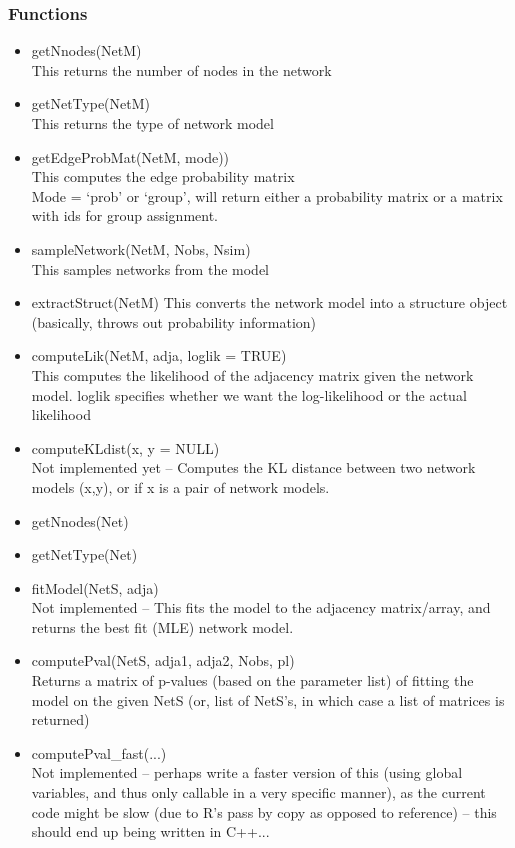 \documentclass[11pt]{article}
\begin{document}
\subsubsection{Functions}
\begin{itemize} 
\item getNnodes(NetM)\\
This returns the number of nodes in the network
\item getNetType(NetM)\\
This returns the type of network model
\item getEdgeProbMat(NetM, mode))\\
This computes the edge probability matrix\\
Mode = `prob' or `group', will return either a probability matrix or a matrix with ids for group assignment. 
\item sampleNetwork(NetM, Nobs, Nsim)\\
This samples networks from the model
\item extractStruct(NetM)
This converts the network model into a structure object (basically, throws out probability information)
\item computeLik(NetM, adja, loglik = TRUE)\\
This computes the likelihood of the adjacency matrix given the network model. loglik specifies whether we want the log-likelihood or the actual likelihood
\item computeKLdist(x, y = NULL) \\
Not implemented yet -- Computes the KL distance between two network models (x,y), or if x is a pair of network models. 

\item getNnodes(Net)
\item getNetType(Net)
\item fitModel(NetS, adja)\\
Not implemented -- This fits the model to the adjacency matrix/array, and returns the best fit (MLE) network model. 
\item computePval(NetS, adja1, adja2, Nobs, pl)\\
Returns a matrix of p-values (based on the parameter list) of fitting the model on the given NetS (or, list of NetS's, in which case a list of matrices is returned)
\item computePval\_fast(...)\\
Not implemented -- perhaps write a faster version of this (using global variables, and thus only callable in a very specific manner), as the current code might be slow (due to R's pass by copy as opposed to reference) -- this should end up being written in C++... 
\end{itemize}
\end{document}
